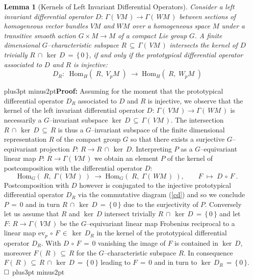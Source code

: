\documentclass[12pt]{article}
\def\ev{\mathrm{ev}}
\def\Hom{\mathrm{Hom}}
\def\proof{\pfill\textbf{Proof:}\quad}
\def\pfill{\vskip6pt plus3pt minus2pt\noindent}
\def\qed{\ensuremath{\hfill\Box}\pfill}
\newtheorem{Lemma}{Lemma}[section]
\begin{document}
 \begin{Lemma}[Kernels of Left Invariant Differential Operators]
 \hfill\label{ked}\break
  Consider a left invariant differential operator $D:\,\Gamma(\,VM\,)
  \longrightarrow\Gamma(\,WM\,)$ between sections of homogeneous vector
  bundles $VM$ and $WM$ over a homogeneous space $M$ under a transitive
  smooth action $G\times M\longrightarrow M$ of a compact Lie group $G$.
  A finite dimensional $G$--characteristic subspace $R\,\subseteq\,
  \Gamma(\,VM\,)$ intersects the kernel of $D$ trivially $R\,\cap\,\ker\,D
  \,=\,\{\,0\,\}$, if and only if the prototypical differential operator
  associated to $D$ and $R$ is injective:
  $$
   D_R:\;\;\Hom_H(\;R,\;V_pM\;)\;\longrightarrow\;\Hom_H(\;R,\;W_pM\;)
  $$
 \end{Lemma}

 \proof
 Assuming for the moment that the prototypical differential operator $D_R$
 associated to $D$ and $R$ is injective, we observe that the kernel of the
 left invariant differential operator $D:\,\Gamma(\,VM\,)\longrightarrow
 \Gamma(\,WM\,)$ is necessarily a $G$--invariant subspace $\ker\,D\,\subseteq
 \,\Gamma(\,VM\,)$. The intersection $R\,\cap\,\ker\,D\,\subseteq\,R$ is thus
 a $G$--invariant subspace of the finite dimensional representation $R$ of
 the compact group $G$ so that there exists a surjective $G$--equivariant
 projection $P:\,R\longrightarrow R\,\cap\,\ker\,D$. Interpreting $P$ as a
 $G$--equivariant linear map $P:\,R\longrightarrow\Gamma(\,VM\,)$ we obtain
 an element $P$ of the kernel of postcomposition with the differential
 operator $D$:
 \begin{equation}\label{post}
  \Hom_G(\;R,\;\Gamma(\,VM\,)\;)\;\longrightarrow\;\Hom_G(\;R,\;
  \Gamma(\,WM\,)\;),\qquad F\;\longmapsto\;D\,\circ\,F\ .
 \end{equation}
 Postcomposition with $D$ however is conjugated to the injective prototypical
 differential operator $D_R$ via the commutative diagram (\ref{cd}) and so
 we conclude $P\,=\,0$ and in turn $R\,\cap\,\ker\,D\,=\,\{\,0\,\}$ due to
 the surjectivity of $P$. Conversely let us assume that $R$ and $\ker\,D$
 intersect trivially $R\,\cap\,\ker\,D\,=\,\{\,0\,\}$ and let $F:\,R
 \longrightarrow\Gamma(\,VM\,)$ be the $G$--equivariant linear map Frobenius
 reciprocal to a linear map $\ev_p\,\circ\,F\,\in\,\ker\,D_R$ in the kernel
 of the prototypical differential operator $D_R$. With $D\,\circ\,F\,=\,0$
 vanishing the image of $F$ is contained in $\ker\,D$, moreover $F(\,R\,)\,
 \subseteq\,R$ for the $G$--characteristic subspace $R$. In consequence
 $F(\,R\,)\,\subseteq\,R\,\cap\,\ker\,D\,=\,\{\,0\,\}$ leading to $F\,=\,0$
 and in turn to $\ker\,D_R\,=\,\{\,0\,\}$.
 \qed
\end{document}
